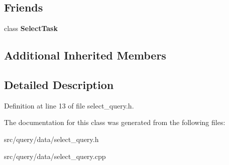 \subsection*{Friends}
\begin{DoxyCompactItemize}
\item 
\mbox{\label{class_select_query_a41f1f8d80f73c7e547ce27261aaa22c0}} 
class {\bfseries Select\+Task}
\end{DoxyCompactItemize}
\subsection*{Additional Inherited Members}


\subsection{Detailed Description}


Definition at line 13 of file select\+\_\+query.\+h.



The documentation for this class was generated from the following files\+:\begin{DoxyCompactItemize}
\item 
src/query/data/select\+\_\+query.\+h\item 
src/query/data/select\+\_\+query.\+cpp\end{DoxyCompactItemize}
